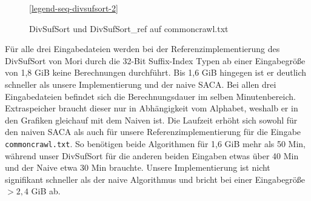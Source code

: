 \begin{figure}[ht]

    \medskip
    \ref{legend-seq-divsufsort-2}
    \caption{DivSufSort und DivSufSort\_ref auf commoncrawl.txt}
    \label{fig:res-divsufsort2}
\end{figure}
\FloatBarrier

Für alle drei Eingabedateien werden bei der Referenzimplementierung des DivSufSort von Mori \cite{saca:5:repo, saca:5} durch die 32-Bit Suffix-Index Typen ab einer Eingabegröße von 1,8 GiB keine Berechnungen durchführt. Bis 1,6 GiB hingegen ist er deutlich schneller als unsere Implementierung und der naive SACA. Bei allen drei Eingabedateien befindet sich die Berechnungsdauer im selben Minutenbereich. Extraspeicher braucht dieser nur in Abhängigkeit vom Alphabet, weshalb er in den Grafiken gleichauf mit dem Naiven ist.
Die Laufzeit erhöht sich sowohl für den naiven SACA als auch für unsere Referenzimplementierung für die Eingabe \texttt{commoncrawl.txt}. So benötigen beide Algorithmen für 1,6 GiB mehr als 50 Min, während unser DivSufSort für die anderen beiden Eingaben etwas über 40 Min und der Naive etwa 30 Min brauchte. Unsere Implementierung ist nicht signifikant schneller als der naive Algorithmus und bricht bei einer Eingabegröße $> 2,4$ GiB ab.

